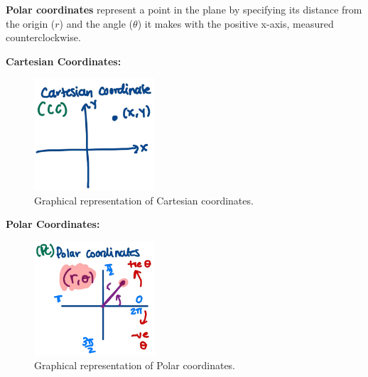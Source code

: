 \documentclass{article}
\begin{document}
\begin{definitionbox}
\textbf{Polar coordinates} represent a point in the plane by specifying its distance from the origin (\( r \)) and the angle (\( \theta \)) it makes with the positive x-axis, measured counterclockwise.

\vspace{0.5em}

\begin{conceptbox}
    \textbf{Cartesian Coordinates:}
    \begin{figure}[H]
        \centering
        \includegraphics[width=0.4\textwidth]{cartesian.png}
        \caption{Graphical representation of Cartesian coordinates.}
        \label{fig:cartesian_coordinates}
    \end{figure}
    
    \textbf{Polar Coordinates:}
    \begin{figure}[H]
        \centering
        \includegraphics[width=0.4\textwidth]{polar.png}
        \caption{Graphical representation of Polar coordinates.}
        \label{fig:polar_coordinates}
    \end{figure}
\end{conceptbox}
\end{definitionbox}
\end{document}
